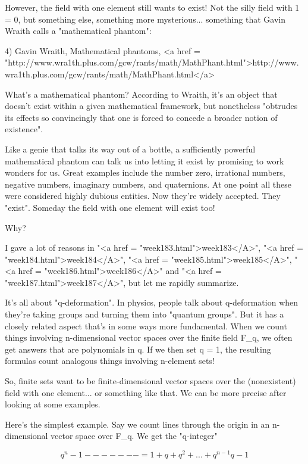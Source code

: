 However, the field with one element still wants to exist!  Not the
silly field with 1 = 0, but something else, something more mysterious...
something that Gavin Wraith calls a "mathematical phantom":
 
4) Gavin Wraith, Mathematical phantoms,
<a href = "http://www.wra1th.plus.com/gcw/rants/math/MathPhant.html">http://www.wra1th.plus.com/gcw/rants/math/MathPhant.html</a>

What's a mathematical phantom?  According to Wraith, it's an object 
that doesn't exist within a given mathematical framework, but 
nonetheless "obtrudes its effects so convincingly that one is forced 
to concede a broader notion of existence".

Like a genie that talks its way out of a bottle, a sufficiently powerful 
mathematical phantom can talk us into letting it exist by promising to
work wonders for us.  Great examples include the number zero, irrational
numbers, negative numbers, imaginary numbers, and quaternions.  At one 
point all these were considered highly dubious entities.  Now they're
widely accepted.  They "exist".  Someday the field with one element 
will exist too!

Why?

I gave a lot of reasons in "<a href = "week183.html">week183</A>", "<a href = "week184.html">week184</A>", "<a href = "week185.html">week185</A>", "<a href = "week186.html">week186</A>" 
and "<a href = "week187.html">week187</A>", but let me rapidly summarize.  

It's all about "q-deformation".  In physics, people talk
about q-deformation when they're taking groups and turning them into
"quantum groups".  But it has a closely related aspect
that's in some ways more fundamental.  When we count things involving
n-dimensional vector spaces over the finite field F_{q}, we
often get answers that are polynomials in q.  If we then set q = 1,
the resulting formulas count analogous things involving n-element
sets!

So, finite sets want to be finite-dimensional vector spaces over the 
(nonexistent) field with one element... or something like that.  We can
be more precise after looking at some examples.

Here's the simplest example.  Say we count lines through the origin 
in an n-dimensional vector space over F_{q}.   We get the "q-integer"


$$

 q^{n} - 1
------- = 1 + q + q^{2} + ... + q^{n-1}
 q - 1
$$
    

